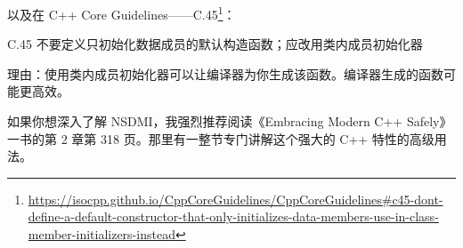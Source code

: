 以及在 C++ Core Guidelines——C.45\footnote{\url{https://isocpp.github.io/CppCoreGuidelines/CppCoreGuidelines\#c45-dont-define-a-default-constructor-that-only-initializes-data-members-use-in-class-member-initializers-instead}}：

\begin{myQuote}
C.45 不要定义只初始化数据成员的默认构造函数；应改用类内成员初始化器

理由：使用类内成员初始化器可以让编译器为你生成该函数。编译器生成的函数可能更高效。
\end{myQuote}

\begin{myInfoBox}
如果你想深入了解 NSDMI，我强烈推荐阅读《Embracing Modern C++ Safely》一书的第 2 章第 318 页。那里有一整节专门讲解这个强大的 C++ 特性的高级用法。
\end{myInfoBox}

